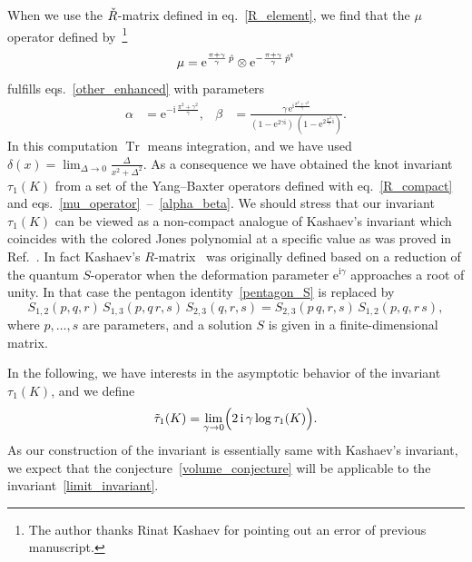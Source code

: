 \documentclass[12pt]{article}
\numberwithin{equation}{section}
\DeclareMathOperator{\Tr}{Tr}
\begin{document}
When we use the $\Check{R}$-matrix defined
in eq.~\eqref{R_element},
we find that the $\mu$ operator defined by~\footnote{
The author  thanks
Rinat Kashaev for pointing out an error of
previous manuscript.}
\begin{equation}
  \label{mu_operator}
  \mu =
  \mathrm{e}^{\frac{\pi + \gamma}{\gamma} \, \Hat{p}}
  \otimes
  \mathrm{e}^{ - \frac{\pi + \gamma}{\gamma} \, \Hat{p}^{\mathrm{t}}}
\end{equation}
fulfills eqs.~\eqref{other_enhanced}
with parameters
\begin{align}
  \label{alpha_beta}
  \alpha
  & =
  \mathrm{e}^{- \mathrm{i} \, \frac{\pi^2+\gamma^2}{\gamma}}
  ,
  &
  \beta
  & =
  \frac{
    \gamma \,
    \mathrm{e}^{\mathrm{i} \frac{\pi^2+\gamma^2}{\gamma}}
    }{
    ( 1 - \mathrm{e}^{2 \gamma \mathrm{i}} ) \,
    ( 1 - \mathrm{e}^{2 \frac{\pi^2}{\gamma} \mathrm{i}})
    } .
\end{align}
In this computation  $\Tr$ means integration, and we have used
$
  \delta(x)
  =
  \lim_{\Delta \to 0} \frac{\Delta}{x^2+ \Delta^2} 
$.
As a consequence we have obtained the knot invariant $\tau_1(K)$ from
a set of the
Yang--Baxter operators defined with  eq.~\eqref{R_compact} and
eqs.~\eqref{mu_operator}~--~\eqref{alpha_beta}.
We should stress
that our invariant $\tau_1(K)$
can be viewed as a  non-compact analogue
of Kashaev's invariant which coincides with the colored Jones
polynomial at a specific value as was proved in Ref.~.
In fact
Kashaev's $R$-matrix~\cite{Kasha95} was originally defined based on 
a reduction of
the quantum $S$-operator
when the deformation parameter $\mathrm{e}^{\mathrm{i} \gamma}$
approaches a root of unity.
In  that case the pentagon identity~\eqref{pentagon_S} is
replaced by
\begin{equation*}
    S_{1,2}(p,q,r) \, S_{1,3}(p, q \, r , s) \, S_{2,3}(q,r,s)
  =
  S_{2,3}(p \, q , r , s) \, S_{1,2}(p,q,r \, s)  ,
\end{equation*}
where $p , \dots, s$ are parameters, and a solution $S$  is given in a
finite-dimensional  matrix.


In the following,
we have interests in the asymptotic behavior of the invariant
$\tau_1(K)$, and we define
\begin{equation}
  \label{limit_invariant}
  \Tilde{\tau}_1(K)
  =
  \lim_{\gamma \to 0}
  \Bigl(
  2 \, \mathrm{i} \, \gamma
  \log \tau_1(K)
  \Bigr) .
\end{equation}
As our construction of the invariant is essentially  same with
Kashaev's invariant,
we expect that
the conjecture~\eqref{volume_conjecture} will be applicable to the
invariant~\eqref{limit_invariant}.
\end{document}
